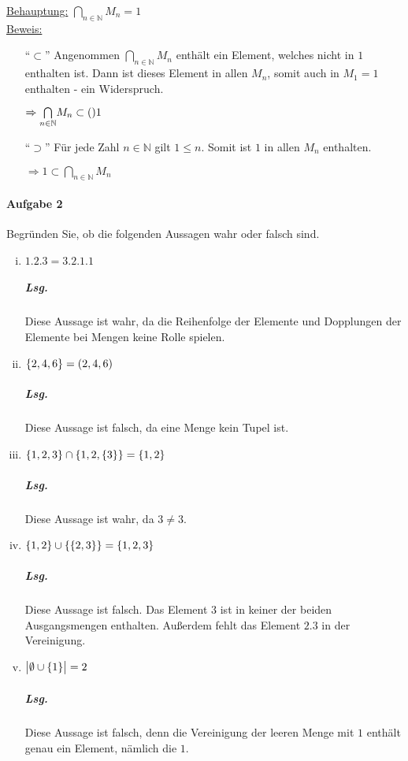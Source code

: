 \documentclass{scrreprt}
\begin{document}
\begin{enumerate}[(a)]
  \newpage
  \underline{Behauptung:} $\underset{n \in \mathbb{N}}\bigcap M_n = \qty{1}$ \\
  \underline{Beweis:}
  \begin{itemize}
  \item[``$\subset$'']
    Angenommen $\underset{n \in \mathbb{N}}\bigcap M_n$ enthält ein Element,
    welches nicht in $\qty{1}$ enthalten ist.
    Dann ist dieses Element in allen $M_n$, somit auch in $M_1 = \qty{1}$
    enthalten - ein Widerspruch.

    $\Rightarrow \underset{n \in \mathbb{N}}\bigcap M_n \subset \qty 1$

  \item[``$\supset$'']
    Für jede Zahl $n \in \mathbb{N}$ gilt $1 \leq n$.
    Somit ist $1$ in allen $M_n$ enthalten.

    $\Rightarrow \qty{1} \subset \underset{n \in \mathbb{N}}\bigcap M_n$
  \end{itemize}
\end{enumerate}

\paragraph{Aufgabe 2} Begründen Sie, ob die folgenden Aussagen wahr oder falsch
sind.
\begin{enumerate}[(i)]
\item $\qty{1, 2, 3} = \qty{3, 2, 1, 1}$
  \subparagraph{Lsg.} Diese Aussage ist wahr, da die Reihenfolge der Elemente
  und Dopplungen der Elemente bei Mengen keine Rolle spielen.

\item $\qty{2, 4, 6} = \qty(2, 4, 6)$
  \subparagraph{Lsg.} Diese Aussage ist falsch, da eine Menge kein Tupel ist.

\item $\qty{1, 2, 3} \cap \qty{1, 2, \qty{3}} = \qty{1, 2}$
  \subparagraph{Lsg.} Diese Aussage ist wahr, da $3 \ne \qty{3}$.

\item $\qty{1, 2} \cup \qty{\qty{2, 3}} = \qty{1, 2, 3}$
  \subparagraph{Lsg.} Diese Aussage ist falsch.
  Das Element $3$ ist in keiner der beiden Ausgangsmengen enthalten.
  Außerdem fehlt das Element $\qty{2, 3}$ in der Vereinigung.

\item $\abs\big{\emptyset \cup \qty{1}} = 2$
  \subparagraph{Lsg.} Diese Aussage ist falsch, denn die Vereinigung der
  leeren Menge mit $\qty{1}$ enthält genau ein Element, nämlich die $1$.
\end{enumerate}
\end{document}
